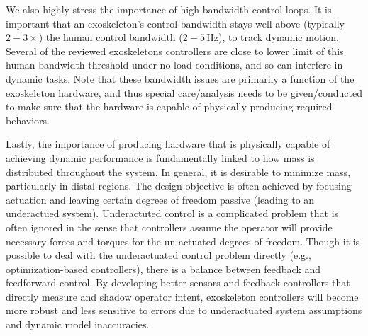 \documentclass[letterpaper,12pt,fullpage]{article}
\begin{document}
We also highly stress the importance of high-bandwidth control loops.  It is important that an exoskeleton's control bandwidth stays well above (typically $2-3\times$) the human control bandwidth ($2-5\,$Hz), to track dynamic motion.  Several of the reviewed exoskeletons controllers are close to lower limit of this human bandwidth threshold under no-load conditions, and so can interfere in dynamic tasks.  Note that these bandwidth issues are primarily a function of the exoskeleton hardware, and thus special care/analysis needs to be given/conducted to make sure that the hardware is capable of physically producing required behaviors. 

Lastly, the importance of producing hardware that is physically capable of achieving dynamic performance is fundamentally linked to how mass is distributed throughout the system.  In general, it is desirable to minimize mass, particularly in distal regions. The design objective is often achieved by focusing actuation and leaving certain degrees of freedom passive (leading to an underactued system).  Underactuted control is a complicated problem that is often ignored in the sense that controllers assume the operator will provide necessary forces and torques for the un-actuated degrees of freedom.  Though it is possible to deal with the underactuated control problem directly (e.g., optimization-based controllers), there is a balance between feedback and feedforward control.  
By developing better sensors and feedback controllers that directly measure and shadow operator intent, exoskeleton controllers will become more robust and less sensitive to errors due to underactuated system assumptions and dynamic model inaccuracies.

%



%


\newpage


\end{document}
